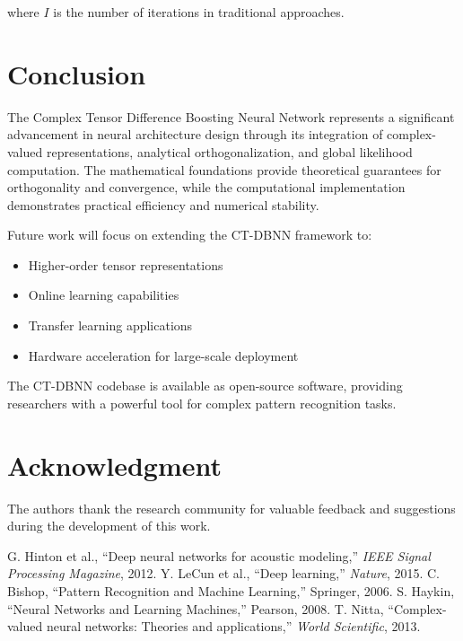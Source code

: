 \documentclass[journal]{IEEEtran}
\begin{document}
where $I$ is the number of iterations in traditional approaches.

\section{Conclusion}

The Complex Tensor Difference Boosting Neural Network represents a significant advancement in neural architecture design through its integration of complex-valued representations, analytical orthogonalization, and global likelihood computation. The mathematical foundations provide theoretical guarantees for orthogonality and convergence, while the computational implementation demonstrates practical efficiency and numerical stability.

Future work will focus on extending the CT-DBNN framework to:
\begin{itemize}
\item Higher-order tensor representations
\item Online learning capabilities
\item Transfer learning applications
\item Hardware acceleration for large-scale deployment
\end{itemize}

The CT-DBNN codebase is available as open-source software, providing researchers with a powerful tool for complex pattern recognition tasks.

\section*{Acknowledgment}
The authors thank the research community for valuable feedback and suggestions during the development of this work.

\begin{thebibliography}{00}
 G. Hinton et al., ``Deep neural networks for acoustic modeling,'' \emph{IEEE Signal Processing Magazine}, 2012.
 Y. LeCun et al., ``Deep learning,'' \emph{Nature}, 2015.
 C. Bishop, ``Pattern Recognition and Machine Learning,'' Springer, 2006.
 S. Haykin, ``Neural Networks and Learning Machines,'' Pearson, 2008.
 T. Nitta, ``Complex-valued neural networks: Theories and applications,'' \emph{World Scientific}, 2013.
\end{thebibliography}
\end{document}
